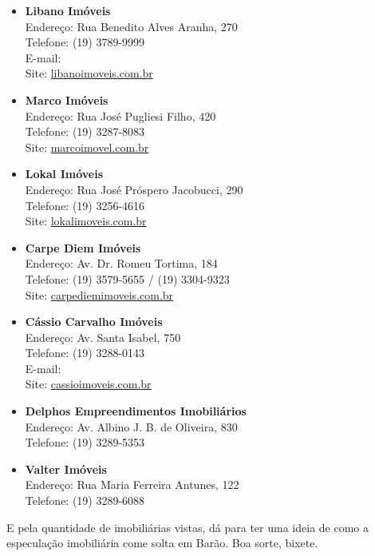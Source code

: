 \begin{itemize}
\item \textbf{Libano Imóveis}
  \\Endereço: Rua Benedito Alves Aranha, 270
  \\Telefone: (19) 3789-9999
  \\E-mail: 
  \\Site: \url{libanoimoveis.com.br}

\item \textbf{Marco Imóveis}
  \\Endereço: Rua José Pugliesi Filho, 420
  \\Telefone: (19) 3287-8083
  \\Site: \url{marcoimovel.com.br}

\item \textbf{Lokal Imóveis}
  \\Endereço: Rua José Próspero Jacobucci, 290
  \\Telefone: (19) 3256-4616
  \\Site: \url{lokalimoveis.com.br}

\item \textbf{Carpe Diem Imóveis}
  \\Endereço: Av. Dr. Romeu Tortima, 184
  \\Telefone: (19) 3579-5655 / (19) 3304-9323
  \\Site: \url{carpediemimoveis.com.br}

\item \textbf{Cássio Carvalho Imóveis}
  \\Endereço: Av. Santa Isabel, 750
  \\Telefone: (19) 3288-0143
  \\E-mail: 
  \\Site: \url{cassioimoveis.com.br}

\item \textbf{Delphos Empreendimentos Imobiliários}
  \\Endereço: Av. Albino J. B. de Oliveira, 830
  \\Telefone: (19) 3289-5353

\item \textbf{Valter Imóveis}
  \\Endereço: Rua Maria Ferreira Antunes, 122
  \\Telefone: (19) 3289-6088
\end{itemize}

E pela quantidade de imobiliárias vistas, dá para ter uma ideia de como a
especulação imobiliária come solta em Barão. Boa sorte, bixete.
